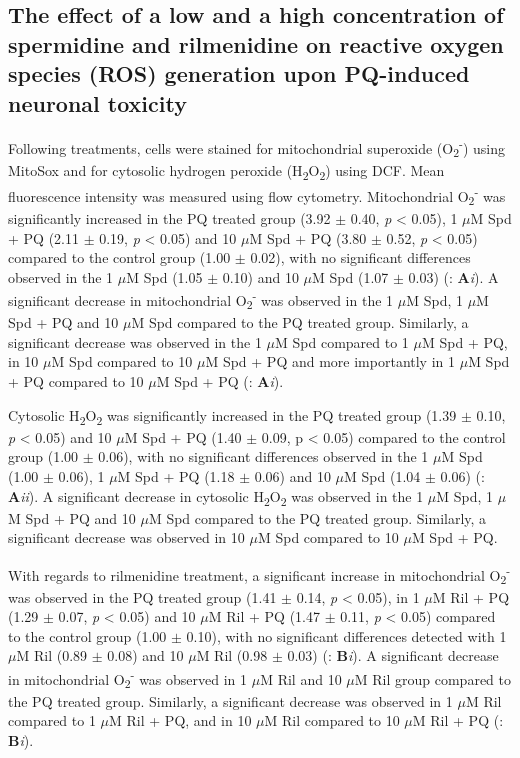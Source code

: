 \subsection{The effect of a low and a high concentration of spermidine and rilmenidine on reactive oxygen species (ROS) generation upon PQ-induced neuronal toxicity}
Following treatments, cells were stained for mitochondrial superoxide (O\textsubscript{2}\textsuperscript{-}) using MitoSox and for cytosolic hydrogen peroxide (H\textsubscript{2}O\textsubscript{2}) using DCF. Mean fluorescence intensity was measured using flow cytometry. Mitochondrial O\textsubscript{2}\textsuperscript{-} was significantly increased in the PQ treated group (3.92 $\pm$ 0.40, \textit{p} < 0.05), 1 $\mu$M Spd + PQ (2.11 $\pm$ 0.19, \textit{p} < 0.05) and 10 $\mu$M Spd + PQ (3.80 $\pm$ 0.52, \textit{p} < 0.05) compared to the control group (1.00 $\pm$ 0.02), with no significant differences observed in the 1 $\mu$M Spd (1.05 $\pm$ 0.10) and 10 $\mu$M Spd (1.07 $\pm$ 0.03) (: \textbf{A}\textit{i}). A significant decrease in mitochondrial O\textsubscript{2}\textsuperscript{-} was observed in the 1 $\mu$M Spd, 1 $\mu$M Spd + PQ and 10 $\mu$M Spd compared to the PQ treated group. Similarly, a significant decrease was observed in the 1 $\mu$M Spd compared to 1 $\mu$M Spd + PQ, in 10 $\mu$M Spd compared to 10 $\mu$M Spd + PQ and more importantly in 1 $\mu$M Spd + PQ compared to 10 $\mu$M Spd + PQ (: \textbf{A}\textit{i}). 

Cytosolic H\textsubscript{2}O\textsubscript{2} was significantly increased in the PQ treated group (1.39 $\pm$ 0.10, \textit{p} < 0.05) and 10 $\mu$M Spd + PQ (1.40 $\pm$ 0.09, p < 0.05) compared to the control group (1.00 $\pm$ 0.06), with no significant differences observed in the 1 $\mu$M Spd (1.00 $\pm$ 0.06), 1 $\mu$M Spd + PQ (1.18 $\pm$ 0.06) and 10 $\mu$M Spd (1.04 $\pm$ 0.06) (: \textbf{A}\textit{ii}). A significant decrease in cytosolic H\textsubscript{2}O\textsubscript{2} was observed in the 1 $\mu$M Spd, 1 $\mu$M Spd + PQ and 10 $\mu$M Spd compared to the PQ treated group. Similarly, a significant decrease was observed in 10 $\mu$M Spd compared to 10 $\mu$M Spd + PQ.

With regards to rilmenidine treatment, a significant increase in mitochondrial O\textsubscript{2}\textsuperscript{-} was observed in the PQ treated group (1.41 $\pm$ 0.14, \textit{p} < 0.05), in 1 $\mu$M Ril + PQ (1.29 $\pm$ 0.07, \textit{p} < 0.05) and 10 $\mu$M Ril + PQ (1.47 $\pm$ 0.11, \textit{p} < 0.05) compared to the control group (1.00 $\pm$ 0.10), with no significant differences detected with 1 $\mu$M Ril (0.89 $\pm$ 0.08) and 10 $\mu$M Ril (0.98 $\pm$ 0.03) (: \textbf{B}\textit{i}). A significant decrease in mitochondrial O\textsubscript{2}\textsuperscript{-} was observed in 1 $\mu$M Ril and 10 $\mu$M Ril group compared to the PQ treated group. Similarly, a significant decrease was observed in 1 $\mu$M Ril compared to 1 $\mu$M Ril + PQ, and in 10 $\mu$M Ril compared to 10 $\mu$M Ril + PQ (: \textbf{B}\textit{i}). 

